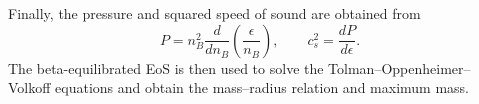 \documentclass[twocolumn,floatfix,superscriptaddress,a4paper,showkeys,nofootinbib,reprint]{revtex4-1}
\begin{document}
Finally, the pressure and squared speed of sound are obtained from
\begin{equation}
    P=n_B^2\frac{d}{dn_B}
    \left(\frac{\epsilon}{n_B}\right),
    \qquad
    c_s^2=\frac{dP}{d\epsilon}.
\end{equation}
The beta-equilibrated EoS is then used to solve the
Tolman--Oppenheimer--Volkoff equations and obtain the mass--radius
relation and maximum mass.


\end{document}
